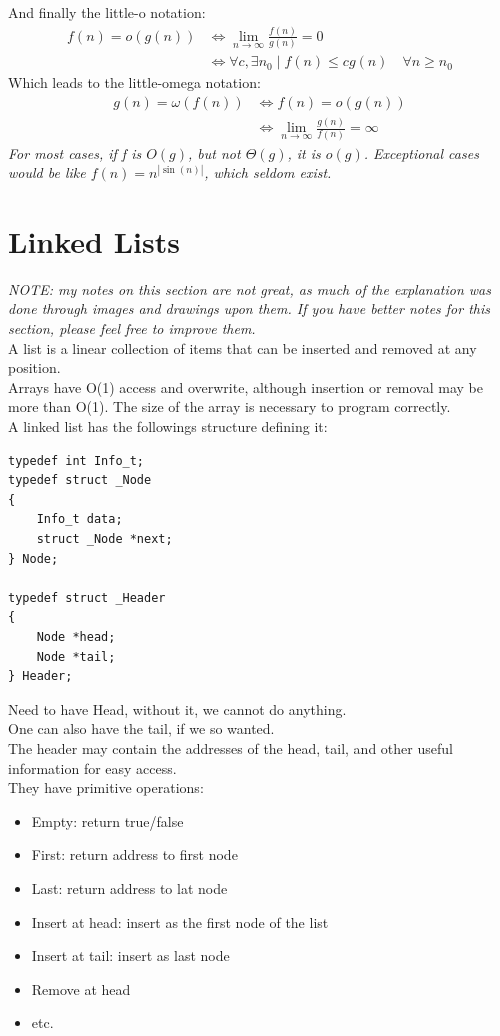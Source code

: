 \documentclass[nobib]{tufte-handout}
\begin{document}
And finally the little-o notation:
\begin{align*}
    f(n) = o(g(n)) &\iff \lim_{n\rightarrow\infty}\frac{f(n)}{g(n)} = 0\\
    &\iff \forall c,\exists n_0 \mid f(n)\leq cg(n) \quad \forall n\geq n_0
\end{align*}
Which leads to the little-omega notation:
\begin{align*}
    g(n) = \omega(f(n)) &\iff f(n) = o(g(n))\\
    &\iff \lim_{n\rightarrow\infty}\frac{g(n)}{f(n)} = \infty
\end{align*}
\textit{For most cases, if f is $O(g)$, but not $\Theta(g)$, it is $o(g)$. Exceptional cases would be like $f(n) = n^{|\sin(n)|}$, which seldom exist.}
\section{Linked Lists}
\textit{NOTE: my notes on this section are not great, as much of the explanation was done through images and drawings upon them. If you have better notes for this section, please feel free to improve them.}\\
A list is a linear collection of items that can be inserted and removed at any position.\\
Arrays have O(1) access and overwrite, although insertion or removal may be more than O(1). The size of the array is necessary to program correctly.\\
A linked list has the followings structure defining it:
\begin{lstlisting}
typedef int Info_t;
typedef struct _Node
{
    Info_t data;
    struct _Node *next;
} Node;

typedef struct _Header
{
    Node *head;
    Node *tail;
} Header;
\end{lstlisting}
Need to have Head, without it, we cannot do anything.\\
One can also have the tail, if we so wanted.\\
The header may contain the addresses of the head, tail, and other useful information for easy access.\\
They have primitive operations:
\begin{itemize}
    \item Empty: return true/false 
    \item First: return address to first node 
    \item Last: return address to lat node 
    \item Insert at head: insert as the first node of the list 
    \item Insert at tail: insert as last node
    \item Remove at head
    \item etc.
\end{itemize}
\end{document}
